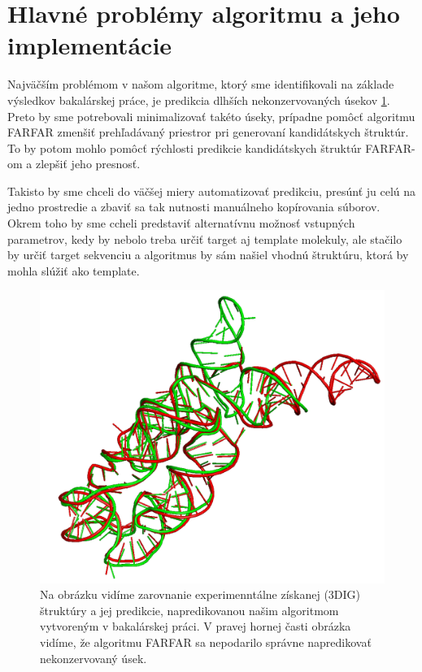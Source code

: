 \section{Hlavné problémy algoritmu a jeho implementácie}
Najväčším problémom v našom algoritme, ktorý sme identifikovali na základe výsledkov bakalárskej práce, je predikcia dlhších nekonzervovaných úsekov \ref{obr3.3:badPredictedRegion}. Preto by sme potrebovali minimalizovať takéto úseky, prípadne pomôcť algoritmu FARFAR zmenšiť prehľadávaný priestror pri generovaní kandidátskych štruktúr. To by potom mohlo pomôcť rýchlosti predikcie kandidátskych štruktúr FARFAR-om a zlepšiť jeho presnosť.

\indent Takisto by sme chceli do väčšej miery automatizovať predikciu, presúnť ju celú na jedno prostredie a zbaviť sa tak nutnosti manuálneho kopírovania súborov. Okrem toho by sme ccheli predstaviť alternatívnu možnosť vstupných parametrov, kedy by nebolo treba určiť target aj template molekuly, ale stačilo by určiť target sekvenciu a algoritmus by sám našiel vhodnú štruktúru, ktorá by mohla slúžiť ako template. 

\begin{figure}%
\includegraphics[width=\textwidth]{../img/badPredictedRegion}
\caption{Na obrázku vidíme zarovnanie experimenntálne získanej (3DIG) štruktúry a jej predikcie, napredikovanou našim algoritmom vytvoreným v bakalárskej práci. V pravej hornej časti obrázka vidíme, že algoritmu FARFAR sa nepodarilo správne napredikovať nekonzervovaný úsek.}
\label{obr3.3:badPredictedRegion}
\end{figure}
